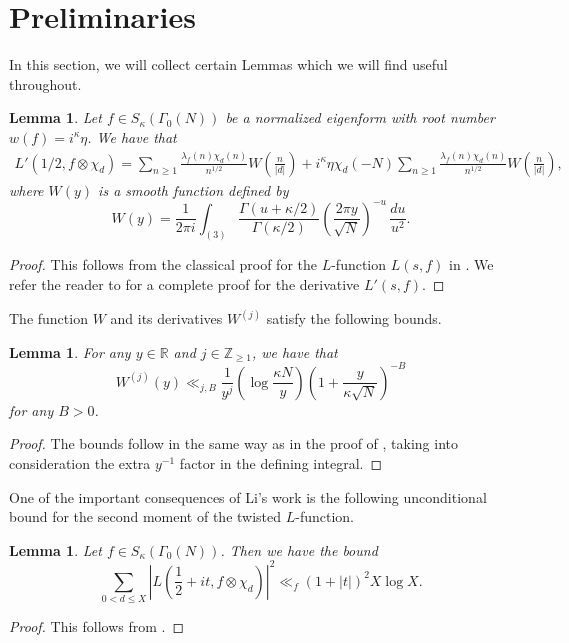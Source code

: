 \documentclass[12pt]{amsart}
\def\Z{\mathbb{Z}}
\newtheorem{lemma}[theorem]{Lemma}
\def\Z{\mathbb Z}
\def\R{\mathbb R}
\def\Z{\mathbb Z}
\def\R{\mathbb R}
\def\log{\operatorname{log}}
\begin{document}
\section{Preliminaries}
In this section, we will collect certain Lemmas which we will find useful throughout.
\begin{lemma}\label{AFE}
    Let $f\in S_{\kappa}(\Gamma_0(N))$ be a normalized eigenform with root number $w(f)=i^{\kappa}\eta$. We have that 
    \begin{align*}
    L'(1/2,f\otimes \chi_d)=\sum_{n\geq 1}\frac{\lambda_f(n)\chi_d(n)}{n^{1/2}}W\left(\frac{n}{|d|}\right)+i^{\kappa}\eta\chi_d(-N)\sum_{n\geq 1}\frac{\lambda_f(n)\chi_d(n)}{n^{1/2}}W\left(\frac{n}{|d|}\right),
    \end{align*}
    where $W(y)$ is a smooth function defined by
    \[W(y)=\frac{1}{2\pi i}\int_{(3)}\frac{\Gamma(u+\kappa/2)}{\Gamma(\kappa/2)}\left(\frac{2\pi y}{\sqrt{N}}\right)^{-u}\,\frac{du}{u^2}.\]
\end{lemma}
\begin{proof}
    This follows from the classical proof for the $L$-function $L(s,f)$ in \cite[Theorem 5.3]{Iwk}. We refer the reader to \cite[Lemma 1]{Petrow} for a complete proof for the derivative $L'(s,f)$.
\end{proof}
 The function $W$ and its derivatives $W^{(j)}$ satisfy the following bounds.
 
\begin{lemma}\label{W_bound}
For any $y\in \R$ and $j\in\Z_{\geq 1}$, we have that
  \[W^{(j)}(y)\ll_{j,B} \frac{1}{y^j}\left(\log\frac{\kappa N}{y}\right)\left(1+\frac{y}{\kappa \sqrt{N}}\right)^{-B}\]
  for any $B>0$.
\end{lemma}

\begin{proof}
    The bounds follow in the same way as in the proof of \cite[Proposition 5.4]{Iwk}, taking into consideration the extra $y^{-1}$ factor in the defining integral.
\end{proof}
One of the important consequences of Li's work \cite{XLi} is the following unconditional bound for the second moment of the twisted $L$-function.
\begin{lemma}\label{XLi_bound}
Let $f\in S_{\kappa}(\Gamma_0(N))$. Then we have the bound
    $$\sum_{0<d\leq X} \left|L\left(\frac{1}{2}+it , f \otimes \chi_d \right)\right|^2 \ll_f (1+|t|)^{2}X \log X .$$
\end{lemma}
\begin{proof}
    This follows from \cite[Proof of Theorem 1.1]{XLi}.
\end{proof}
\end{document}
